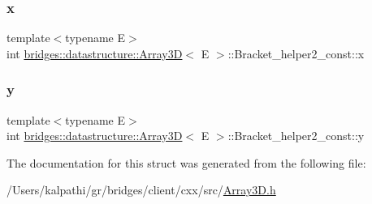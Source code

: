 \subsubsection{\texorpdfstring{x}{x}}
{\footnotesize\ttfamily template$<$typename E$>$ \\
int \mbox{\hyperlink{classbridges_1_1datastructure_1_1_array3_d}{bridges\+::datastructure\+::\+Array3D}}$<$ E $>$\+::Bracket\+\_\+helper2\+\_\+const\+::x}

\mbox{\label{structbridges_1_1datastructure_1_1_array3_d_1_1_bracket__helper2__const_a5c76d396209c5060f72c321d2b70e707}} 
\subsubsection{\texorpdfstring{y}{y}}
{\footnotesize\ttfamily template$<$typename E$>$ \\
int \mbox{\hyperlink{classbridges_1_1datastructure_1_1_array3_d}{bridges\+::datastructure\+::\+Array3D}}$<$ E $>$\+::Bracket\+\_\+helper2\+\_\+const\+::y}



The documentation for this struct was generated from the following file\+:\begin{DoxyCompactItemize}
\item 
/\+Users/kalpathi/gr/bridges/client/cxx/src/\mbox{\hyperlink{_array3_d_8h}{Array3\+D.\+h}}\end{DoxyCompactItemize}
